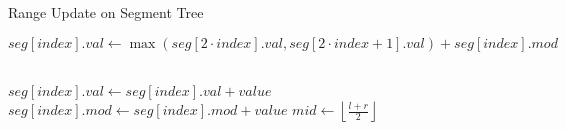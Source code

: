 \begin{algorithm}
    \caption{Range Update on Segment Tree}
    \begin{algorithmic}

         
            \State $seg[index].val \gets \max(seg[2 \cdot index].val, seg[2 \cdot index + 1].val) + seg[index].mod$
        \EndProcedure

        \\

                \State \Return
                \State $seg[index].val \gets seg[index].val + value$
                \State $seg[index].mod \gets seg[index].mod + value$
                \State \Return
            \Else
                \State $mid \gets \left\lfloor \frac{l + r}{2} \right\rfloor$
                \State {}
                \State {}
                \State {}
            \EndIf
        \EndProcedure
    \end{algorithmic}
\end{algorithm}
